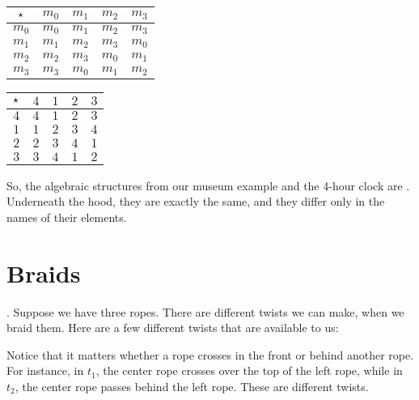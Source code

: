 \documentclass[../../../main.tex]{subfiles}
\begin{document}
\begin{center}
  \begin{tabular}{| c || c | c | c | c |}
    \hline
    $\opSymbol/$ & $m_{0}$ & $m_{1}$ & $m_{2}$ & \cellcolor{grey3} $m_{3}$ \\ \hline \hline
    $m_{0}$      & $m_{0}$ & $m_{1}$ & $m_{2}$ & \cellcolor{grey3} $m_{3}$ \\ \hline
    $m_{1}$      & $m_{1}$ & $m_{2}$ & \cellcolor{grey3} $m_{3}$ & $m_{0}$ \\ \hline
    $m_{2}$      & $m_{2}$ & \cellcolor{grey3} $m_{3}$ & $m_{0}$ & $m_{1}$ \\ \hline
    \cellcolor{grey3} $m_{3}$      & \cellcolor{grey3} $m_{3}$ & $m_{0}$ & $m_{1}$ & $m_{2}$ \\ \hline
  \end{tabular}
  \hskip 2cm
  \begin{tabular}{| c || c | c | c | c |}
    \hline
    $\opSymbol/$ & $4$ & $1$ & $2$ & \cellcolor{grey3} $3$ \\ \hline \hline
    $4$          & $4$ & $1$ & $2$ & \cellcolor{grey3} $3$ \\ \hline
    $1$          & $1$ & $2$ & \cellcolor{grey3} $3$ & $4$ \\ \hline
    $2$          & $2$ & \cellcolor{grey3} $3$ & $4$ & $1$ \\ \hline
    \cellcolor{grey3} $3$          & \cellcolor{grey3} $3$ & $4$ & $1$ & $2$ \\ \hline
  \end{tabular}
\end{center}

So, the algebraic structures from our museum example and the 4-hour clock are . Underneath the hood, they are exactly the same, and they differ only in the names of their elements.


\section{Braids}

. Suppose we have three ropes. There are different twists we can make, when we braid them. Here are a few different twists that are available to us:

\begin{aside}
  \begin{remark}
    Notice that it matters whether a rope crosses in the front or behind another rope. For instance, in $t_{1}$, the center rope crosses over the top of the left rope, while in $t_{2}$, the center rope passes behind the left rope. These are different twists.
  \end{remark}
\end{aside}
\end{document}
